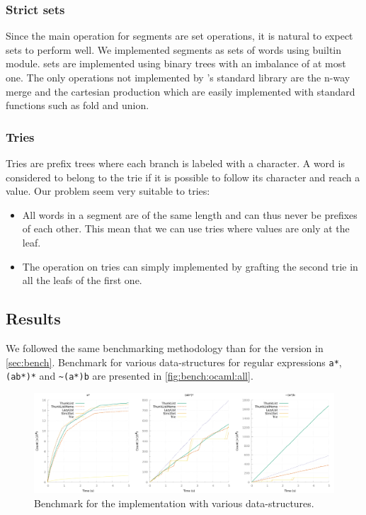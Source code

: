 \subsubsection{Strict sets}

Since the main operation for segments are set operations, it is natural to
expect sets to perform well. We implemented segments as sets
of words using \ocaml builtin  module. \ocaml sets are implemented
using binary trees with an imbalance of at most one.
The only operations not implemented by \ocaml's standard library are
the n-way merge and the cartesian production which are easily implemented with
standard functions such as fold and union.

\subsubsection{Tries}

Tries are prefix trees where each branch is labeled with
a character. A word is considered to belong to the trie if it is possible to
follow its character and reach a value. Our problem seem very suitable to tries:
\begin{itemize}
\item All words in a segment are of the same length and can thus never be prefixes
  of each other. This mean that we can use tries where values are only
  at the leaf.
\item The  operation on tries can simply implemented by
  grafting the second trie in all the leafs of the first one.
\end{itemize}

\TODO{}

\subsection{Results}

We followed the same benchmarking methodology than for the \haskell
version in \autoref{sec:bench}. Benchmark for various data-structures
for regular expressions \verb/a*/, \verb/(ab*)*/ and \verb/~(a*)b/ are
presented in \autoref{fig:bench:ocaml:all}.

\begin{figure}
  \centering
  \includegraphics[width=\linewidth]{measure/ocaml_all.png}
  \caption{Benchmark for the \ocaml implementation with various data-structures.}
  \label{fig:bench:ocaml:all}
\end{figure}


